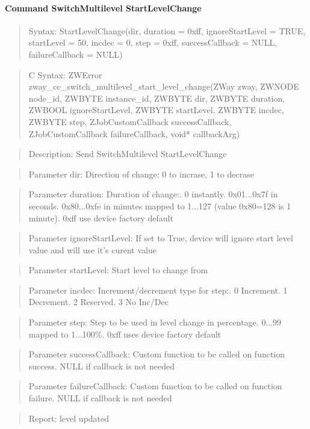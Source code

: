 \paragraph{Command SwitchMultilevel StartLevelChange}
\begin{quote}Syntax: StartLevelChange(dir, duration = 0xff, ignoreStartLevel = TRUE, startLevel = 50, incdec = 0, step = 0xff, successCallback = NULL, failureCallback = NULL)\end{quote}
\begin{quote}C Syntax: ZWError zway\_cc\_switch\_multilevel\_start\_level\_change(ZWay zway, ZWNODE node\_id, ZWBYTE instance\_id, ZWBYTE dir, ZWBYTE duration, ZWBOOL ignoreStartLevel, ZWBYTE startLevel, ZWBYTE incdec, ZWBYTE step, ZJobCustomCallback successCallback, ZJobCustomCallback failureCallback, void* callbackArg)\end{quote}
\begin{quote}Description: Send SwitchMultilevel StartLevelChange\end{quote}
\begin{quote}Parameter dir: Direction of change: 0 to incrase, 1 to decrase\end{quote}
\begin{quote}Parameter duration: Duration of change:. 0 instantly. 0x01...0x7f in seconds. 0x80...0xfe in minutes mapped to 1...127 (value 0x80=128 is 1 minute). 0xff use device factory default\end{quote}
\begin{quote}Parameter ignoreStartLevel: If set to True, device will ignore start level value and will use it's curent value\end{quote}
\begin{quote}Parameter startLevel: Start level to change from\end{quote}
\begin{quote}Parameter incdec: Increment/decrement type for step:. 0 Increment. 1 Decrement. 2 Reserved. 3 No Inc/Dec\end{quote}
\begin{quote}Parameter step: Step to be used in level change in percentage. 0...99 mapped to 1...100\%. 0xff uses device factory default\end{quote}
\begin{quote}Parameter successCallback: Custom function to be called on function success. NULL if callback is not needed\end{quote}
\begin{quote}Parameter failureCallback: Custom function to be called on function failure. NULL if callback is not needed\end{quote}
\begin{quote}Report: level updated\end{quote}

